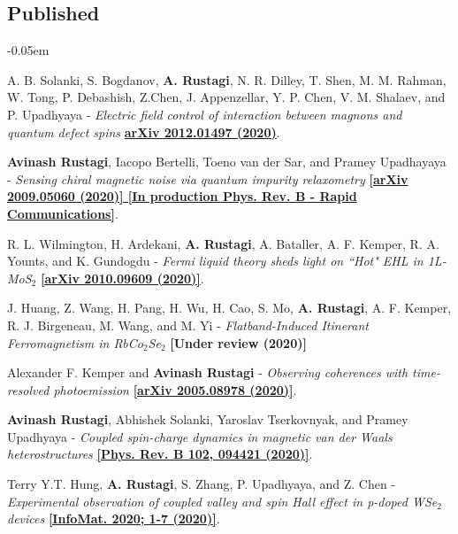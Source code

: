 \documentclass[12pt]{article}
\begin{document}
\subsection*{Published}
\begin{etaremune}
\itemsep-0.05em
\item A. B. Solanki, S. Bogdanov, {\bf A. Rustagi}, N. R. Dilley, T. Shen, M. M. Rahman, W. Tong, P. Debashish, Z.Chen, J. Appenzellar, Y. P. Chen, V. M. Shalaev, and P. Upadhyaya - \textit{Electric field control of interaction between magnons and quantum defect spins} \href{https://arxiv.org/abs/2012.01497}{\bf arXiv 2012.01497 (2020)}.

\item {\bf Avinash Rustagi}, Iacopo Bertelli, Toeno van der Sar, and Pramey Upadhayaya - \textit{Sensing chiral magnetic noise via quantum impurity relaxometry} \href{https://arxiv.org/abs/2009.05060}{\bf [arXiv 2009.05060 (2020)] [In production Phys. Rev. B - Rapid Communications]}.

\item R. L. Wilmington, H. Ardekani, {\bf A. Rustagi}, A. Bataller, A. F. Kemper, R. A. Younts, and K. Gundogdu - \textit{Fermi liquid theory sheds light on ``Hot" EHL in 1L-MoS$_2$} \href{https://arxiv.org/abs/2010.09609}{\bf [arXiv 2010.09609 (2020)]}.

\item J. Huang, Z. Wang, H. Pang, H. Wu, H. Cao, S. Mo, {\bf A. Rustagi}, A. F. Kemper, R. J. Birgeneau, M. Wang, and M. Yi - \textit{Flatband-Induced Itinerant Ferromagnetism in RbCo$_2$Se$_2$} {\bf [Under review (2020)]}

\item Alexander F. Kemper and {\bf Avinash Rustagi} - \textit{Observing coherences with time-resolved photoemission} \href{https://arxiv.org/abs/2005.08978}{\bf [arXiv 2005.08978 (2020)]}.

\item {\bf Avinash Rustagi}, Abhishek Solanki, Yaroslav Tserkovnyak, and Pramey Upadhyaya - \textit{Coupled spin-charge dynamics in magnetic van der Waals heterostructures} \href{https://link.aps.org/doi/10.1103/PhysRevB.102.094421}{\bf [Phys. Rev. B 102, 094421 (2020)]}.

\item Terry Y.T. Hung, {\bf A. Rustagi}, S. Zhang, P. Upadhyaya, and Z. Chen - \textit{Experimental observation of coupled valley and spin Hall effect in p-doped WSe$_2$ devices} \href{http://dx.doi.org/10.1002/inf2.12095} {\bf[InfoMat. 2020; 1-7 (2020)]}.


\end{etaremune}
\end{document}
